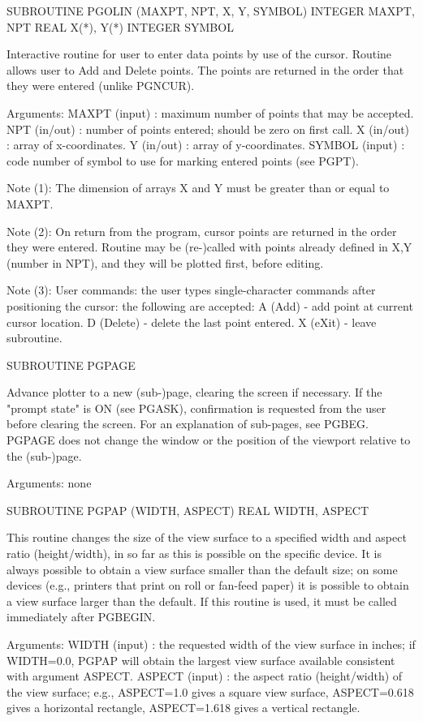 {\eightpoint\begintt
      SUBROUTINE PGOLIN (MAXPT, NPT, X, Y, SYMBOL)
      INTEGER MAXPT, NPT
      REAL    X(*), Y(*)
      INTEGER SYMBOL
 
Interactive routine for user to enter data points by use of
the cursor.  Routine allows user to Add and Delete points.  The
points are returned in the order that they were entered (unlike
PGNCUR).
 
Arguments:
 MAXPT  (input)  : maximum number of points that may be accepted.
 NPT    (in/out) : number of points entered; should be zero on
                   first call.
 X      (in/out) : array of x-coordinates.
 Y      (in/out) : array of y-coordinates.
 SYMBOL (input)  : code number of symbol to use for marking
                   entered points (see PGPT).
 
Note (1): The dimension of arrays X and Y must be greater than or
equal to MAXPT.
 
Note (2): On return from the program, cursor points are returned in
the order they were entered. Routine may be (re-)called with points
already defined in X,Y (number in NPT), and they will be plotted
first, before editing.
 
Note (3): User commands: the user types single-character commands
after positioning the cursor: the following are accepted:
A (Add)    - add point at current cursor location.
D (Delete) - delete the last point entered.
X (eXit)   - leave subroutine.
\endtt}

{\eightpoint\begintt
      SUBROUTINE PGPAGE
 
Advance plotter to a new (sub-)page, clearing the screen if
necessary. If the "prompt state" is ON (see PGASK), confirmation is
requested from the user before clearing the screen.  For an
explanation of sub-pages, see PGBEG.  PGPAGE does not change the
window or the position of the viewport relative to the (sub-)page.
 
Arguments: none
\endtt}

{\eightpoint\begintt
      SUBROUTINE PGPAP (WIDTH, ASPECT)
      REAL WIDTH, ASPECT
 
This routine changes the size of the view surface to a specified
width and aspect ratio (height/width), in so far as this is possible
on the specific device. It is always possible to obtain a view
surface smaller than the default size; on some devices (e.g.,
printers that print on roll or fan-feed paper) it is possible
to obtain a view surface larger than the default. If this routine is
used, it must be called immediately after PGBEGIN.
 
Arguments:
 WIDTH  (input)  : the requested width of the view surface in inches;
                   if WIDTH=0.0, PGPAP will obtain the largest view
                   surface available consistent with argument ASPECT.
 ASPECT (input)  : the aspect ratio (height/width) of the view
                   surface; e.g., ASPECT=1.0 gives a square view
                   surface, ASPECT=0.618 gives a horizontal
                   rectangle, ASPECT=1.618 gives a vertical rectangle.
\endtt}

